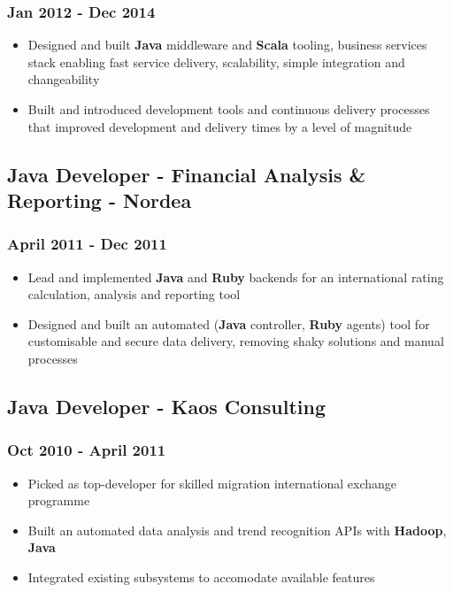 \documentclass[11pt]{article}
\begin{document}
\subsubsection*{Jan 2012 - Dec 2014}
\label{sec:orgdd10c95}
\begin{itemize}
\item Designed and built \textbf{Java} middleware and \textbf{Scala} tooling, business services stack enabling fast service delivery, scalability, simple integration and changeability
\item Built and introduced development tools and continuous delivery processes that improved development and delivery times by a level of magnitude
\end{itemize}
\subsection*{Java Developer - Financial Analysis \& Reporting - Nordea}
\label{sec:orge2919cd}
\subsubsection*{April 2011 - Dec 2011}
\label{sec:org4ef430f}
\begin{itemize}
\item Lead and implemented \textbf{Java} and \textbf{Ruby} backends for an international rating calculation, analysis and reporting tool
\item Designed and built an automated (\textbf{Java} controller, \textbf{Ruby} agents) tool for customisable and secure data delivery, removing shaky solutions and manual processes
\end{itemize}
\subsection*{Java Developer - Kaos Consulting}
\label{sec:org1733ebc}
\subsubsection*{Oct 2010 - April 2011}
\label{sec:org9ba88f1}
\begin{itemize}
\item Picked as top-developer for skilled migration international exchange programme
\item Built an automated data analysis and trend recognition APIs with \textbf{Hadoop}, \textbf{Java}
\item Integrated existing subsystems to accomodate available features
\end{itemize}
\end{document}
